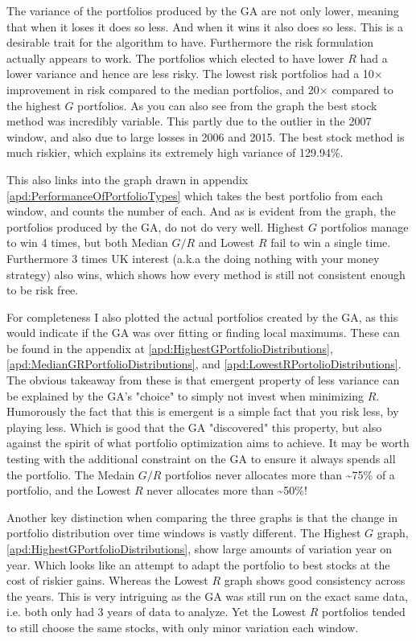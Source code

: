 \documentclass[11pt]{article}
\begin{document}
    The variance of the portfolios produced by the GA are not only lower, meaning that
    when it loses it does so less. And when it wins it also does so less. This is a
    desirable trait for the algorithm to have. Furthermore the risk formulation
    actually appears to work. The portfolios which elected to have lower \(R\)
    had a lower variance and hence are less risky. The lowest risk portfolios
    had a 10\(\times\) improvement in risk compared to the median portfolios, and 20\(\times\)
    compared to the highest \(G\) portfolios. As you can also see from the graph the best
    stock method was incredibly variable. This partly due to the outlier in the 2007
    window, and also due to large losses in 2006 and 2015. The best stock method
    is much riskier, which explains its extremely high variance of 129.94\%.

    This also links into the graph drawn in appendix \ref{apd:PerformanceOfPortfolioTypes}
    which takes the best portfolio from each window, and counts the number of each.
    And as is evident from the graph, the portfolios produced by the GA, do not
    do very well. Highest \(G\) portfolios manage to win 4 times, but both
    Median \(G/R\) and Lowest \(R\) fail to win a single time. Furthermore 3
    times UK interest (a.k.a the doing nothing with your money strategy)
    also wins, which shows how every method is still not consistent enough to
    be risk free.

    For completeness I also plotted the actual portfolios created by the GA, as this
    would indicate if the GA was over fitting or finding local maximums. These can
    be found in the appendix at \ref{apd:HighestGPortfolioDistributions},
    \ref{apd:MedianGRPortfolioDistributions}, and
    \ref{apd:LowestRPortolioDistributions}. The obvious takeaway from these is that
    emergent property of less variance can be explained by the GA's "choice" to
    simply not invest when minimizing \(R\). Humorously the fact that this is emergent
    is a simple fact that you risk less, by playing less. Which is good that the GA
    "discovered" this property, but also against the spirit of what portfolio
    optimization aims to achieve. It may be worth testing with the additional
    constraint on the GA to ensure it always spends all the portfolio. The Medain
    \(G/R\) portfolios never allocates more than \textasciitilde75\% of a portfolio,
    and the Lowest \(R\) never allocates more than \textasciitilde50\%!

    Another key distinction when comparing the three graphs is that the change in
    portfolio distribution over time windows is vastly different. The Highest
    \(G\) graph, \ref{apd:HighestGPortfolioDistributions}, show large amounts
    of variation year on year. Which looks like an attempt to adapt the portfolio
    to best stocks at the cost of riskier gains. Whereas the Lowest \(R\) graph
    shows good consistency across the years. This is very intriguing as the
    GA was still run on the exact same data, i.e. both only had 3 years of data to
    analyze. Yet the Lowest \(R\) portfolios tended to still choose the same stocks,
    with only minor variation each window.
\end{document}
